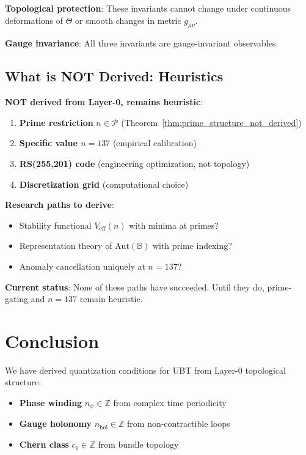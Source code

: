 \documentclass[12pt]{article}
\newcommand{\B}{\mathbb{B}}
\newcommand{\Z}{\mathbb{Z}}
\begin{document}
\textbf{Topological protection}: These invariants cannot change under continuous deformations of $\Theta$ or smooth changes in metric $g_{\mu\nu}$.

\textbf{Gauge invariance}: All three invariants are gauge-invariant observables.

\subsection{What is NOT Derived: Heuristics}

\textbf{NOT derived from Layer-0, remains heuristic}:
\begin{enumerate}
    \item \textbf{Prime restriction} $n \in \mathcal{P}$ (Theorem~\ref{thm:prime_structure_not_derived})
    \item \textbf{Specific value $n=137$} (empirical calibration)
    \item \textbf{RS(255,201) code} (engineering optimization, not topology)
    \item \textbf{Discretization grid} (computational choice)
\end{enumerate}

\textbf{Research paths to derive}:
\begin{itemize}
    \item Stability functional $V_{\text{eff}}(n)$ with minima at primes?
    \item Representation theory of $\mathrm{Aut}(\B)$ with prime indexing?
    \item Anomaly cancellation uniquely at $n=137$?
\end{itemize}

\textbf{Current status}: None of these paths have succeeded. Until they do, prime-gating and $n=137$ remain heuristic.

\section{Conclusion}

We have derived quantization conditions for UBT from Layer-0 topological structure:
\begin{itemize}
    \item \textbf{Phase winding} $n_\psi \in \Z$ from complex time periodicity
    \item \textbf{Gauge holonomy} $n_{\text{hol}} \in \Z$ from non-contractible loops
    \item \textbf{Chern class} $c_1 \in \Z$ from bundle topology
\end{itemize}
\end{document}
